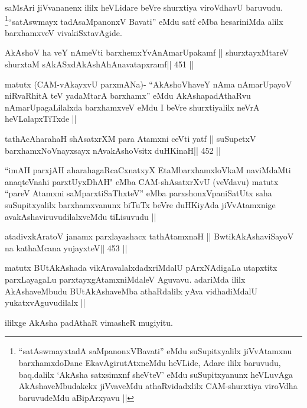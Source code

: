 \begin{artha}
saMsAri jiVvananenx ililx heVLidare beVre shurxtiya viroVdhavU
baruvudu. \footnote[1]{``satAswmayxtadA saMpanonxVBavati'' eMdu suSupitxyalilx jiVvAtamxnu
barxhamxdoDane EkavAgirutAtxneMdu heVLide, Adare ililx baruvudu,
baq.dalilx `AkAsha satxsimxnf sheVteV' eMdu suSupitxyanunx heVLuvAga
AkAshaveMbudakekx jiVvaveMdu athaRvidadxlilx CAM-shurxtiya viroVdha
baruvudeMdu aBipArxyavu ||}``satAswmayx tadAsaMpanonxV Bavati'' eMdu satf eMba
hesariniMda alilx barxhamxveV vivakiSxtavAgide.
\end{artha}


\begin{shl}
AkAshoV ha veY nAmeVti barxhemxYvAnAmarUpakamf ||
shurxtayxMtareV shurxtaM sAkASxdAkAshAhAnavatapxramf\hfill || 451 ||
\end{shl}

\begin{artha}
matutx (CAM-vAkayxvU parxmANa)- ``AkAshoVhaveY nAma nAmarUpayoV
niRvaRhitA teV yadaMtarA barxhamx'' eMdu AkAshapadAthaRvu
nAmarUpagaLilalxda barxhamxveV eMdu I beVre shurxtiyalilx neVrA
heVLalapxTiTxde ||
\end{artha}

\begin{shl}
tathAcAharahaH shAsatxrXM para Atamxni ceVti yatf ||
suSupetxV barxhamxNoV\s nayxsayx nAvakAshoV\s sitx duHKinaH\hfill || 452 ||
\end{shl}

\begin{artha}
``imAH parxjAH aharahagaRcaCxnatxyX EtaMbarxhamxloVkaM naviMdaMti
  anaqteVnahi parxtUyxDhAH" eMba CAM-shAsatxrXvU (veVdavu) matutx
  ``pareV Atamxni saMparxtiSaThxteV'' eMba parxshonxVpaniSatUtx saha
  suSupitxyalilx barxhamxvanunx biTuTx beVre duHKiyAda jiVvAtamxnige
  avakAshaviruvudilalxveMdu tiLisuvudu ||
\end{artha}

\begin{shl}
atadivxkAratoV janamx parxlayashacx tathA\s\s tamxnaH ||
BwtikAkAshaviSayoV na kathaMcana yujayxteV\hfill || 453 ||
\end{shl}

\begin{artha}
matutx BUtAkAshada vikAravalalxdadxriMdalU pArxNAdigaLa utapxtitx
parxLayagaLu parxtayxgAtamxniMdaleV Aguvavu. adariMda ililx
AkAshaveMbudu BUtAkAshaveMba athaRdalilx yAva vidhadiMdalU
yukatxvAguvudilalx ||
\end{artha}

\begin{artha}
ililxge AkAsha padAthaR vimasheR mugiyitu.
\end{artha}


